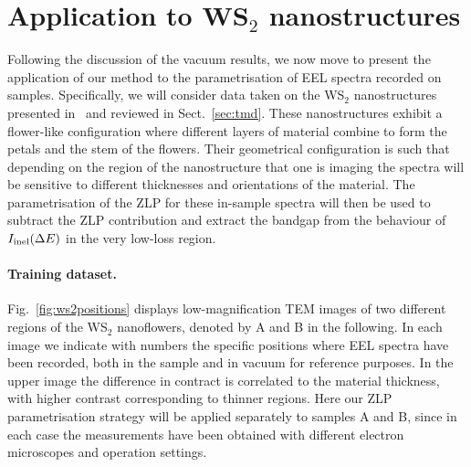 \section{Application to WS$_2$ nanostructures}
\label{sec:results_sample}

Following the discussion of the vacuum results, we now move
to present the application of our method to the parametrisation
of EEL spectra recorded on samples.
%
Specifically, we will consider data taken on the WS$_2$ nanostructures
presented in~\cite{SabryaWS2} and reviewed in Sect.~\ref{sec:tmd}.
%
These nanostructures exhibit a flower-like configuration where different layers
of material combine to form the petals and the stem of the flowers.
%
Their geometrical configuration is such that depending on the region
of the nanostructure that one is imaging the spectra will be sensitive
to different thicknesses and orientations of the material.
%
The parametrisation of the ZLP for these in-sample spectra will then be used
to subtract the ZLP contribution and extract the bandgap from
the behaviour of $I_{\rm inel}(\Delta E)$ in the very low-loss region.

\paragraph{Training dataset.}
%
Fig.~\ref{fig:ws2positions} displays
low-magnification TEM images of two different regions of
the WS$_2$ nanoflowers, denoted by A and B in the following.
%
In each image we indicate with numbers the specific positions where
EEL spectra have been recorded, both in the sample and in vacuum for
reference purposes.
%
In the upper image the difference in contract is correlated to the material
thickness, with higher contrast corresponding to thinner regions.
%
Here our ZLP parametrisation strategy will be applied separately
to samples A and B, since in each case the measurements have
been obtained with different electron microscopes and
operation settings.

